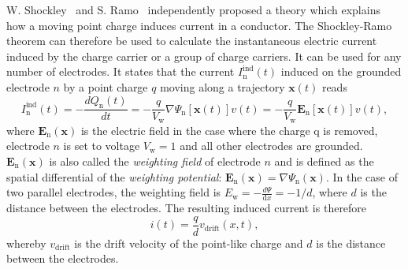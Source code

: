 W. Shockley~\cite{SHOCKLEY:00000} and S. Ramo~\cite{RAMO:00000} independently proposed a theory which explains how a moving point charge induces current in a conductor. The Shockley-Ramo theorem can therefore be used to calculate the instantaneous electric current induced by the charge carrier or a group of charge carriers. It can be used for any number of electrodes. It states that the current $I_\mathrm{n}^{\mathrm{ind}}(t)$ induced on the grounded electrode $n$ by a point charge $q$ moving along a trajectory $\textbf{x}(t)$ reads
\begin{equation}
\label{eq:ramo}
I_\mathrm{n}^{\mathrm{ind}}(t) = -\frac{dQ_\mathrm{n}(t)}{dt} =  -\frac{q}{V_\mathrm{w}}\nabla\Psi_\mathrm{n}[\textbf{x}(t)]v(t)  =  -\frac{q}{V_\mathrm{w}}\textbf{E}_\mathrm{n}[\textbf{x}(t)]v(t),
\end{equation}
where $\textbf{E}_\mathrm{n}(\textbf{x})$ is the electric field in the case where the charge q is removed, electrode $n$ is  set to voltage $V_\mathrm{w}=1$ and all other electrodes are grounded. $\textbf{E}_\mathrm{n}(\textbf{x})$ is also called the \emph{weighting field} of electrode $n$ and is defined as the spatial differential of the \emph{weighting potential}: $\textbf{E}_\mathrm{n}(\textbf{x})=\nabla \Psi_\mathrm{n}(\textbf{x})$. In the case of two parallel electrodes, the weighting field is $E_\mathrm{w} = -\frac{d\Psi}{\mathrm{d}x} = -1/d$, where $d$ is the distance between the electrodes. The resulting induced current is therefore
\begin{equation}
\label{eq:ramoparallel}
i(t) = \frac{q}{d}v_\mathrm{drift}(x,t),
\end{equation} 
whereby $v_{\mathrm{drift}}$ is the drift velocity of the point-like charge and $d$ is the distance between the electrodes.








